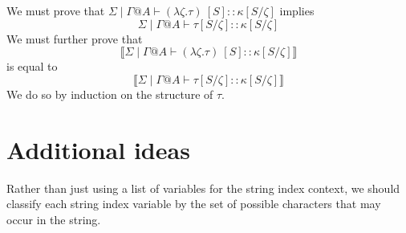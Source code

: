 \documentclass{article}
\newcommand{\sem}[1]{\llbracket #1 \rrbracket}
\begin{document}
We must prove that $\Sigma \mid \Gamma @ A \vdash (\lambda \zeta.\tau)~[S] :: \kappa[S/\zeta]$ implies 
$$\Sigma \mid \Gamma @ A \vdash \tau[S/\zeta] :: \kappa[S/\zeta]$$
We must further prove that $$\sem{\Sigma \mid \Gamma @ A \vdash (\lambda \zeta.\tau)~[S] :: \kappa[S/\zeta]}$$
is equal to $$\sem{\Sigma \mid \Gamma @ A \vdash \tau[S/\zeta] :: \kappa[S/\zeta]}$$
We do so by induction on the structure of $\tau$.

\section*{Additional ideas}

Rather than just using a list of variables for the string index context, we should classify each
string index variable by the set of possible characters that may occur in the string. 
 
\end{document}
